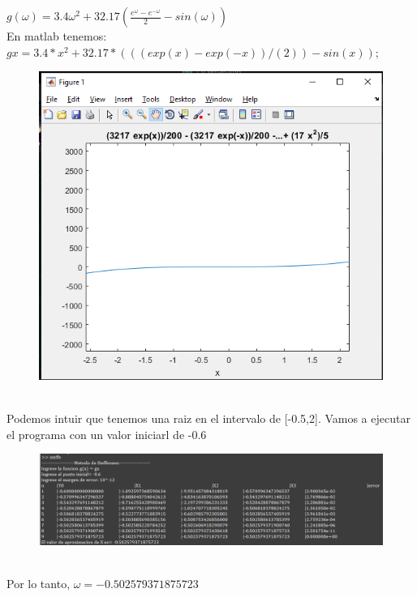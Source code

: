 \documentclass{article}
\theoremstyle{mytheoremstyle}
\theoremstyle{mytheoremstyle}
\theoremstyle{myproblemstyle}
\begin{document}
$g(\omega)=3.4\omega^2+32.17(\frac{e^{\omega}-e^{-\omega}}{2}-sin(\omega))$
\\En matlab tenemos: $gx=3.4*x^2+32.17*(((exp(x)-exp(-x))/(2))-sin(x));$
\pagebreak
\begin{figure}[ht]
    \includegraphics[scale=0.6]{img/stf30_3.png}
\end{figure}
\\Podemos intuir que tenemos una raiz en el intervalo de [-0.5,2]. Vamos a ejecutar el programa con un valor iniciarl de -0.6
\begin{figure}[ht]
    \includegraphics[scale=0.6]{img/stf30_4.png}
\end{figure}
\\Por lo tanto, $\omega=-0.502579371875723$
\end{document}
